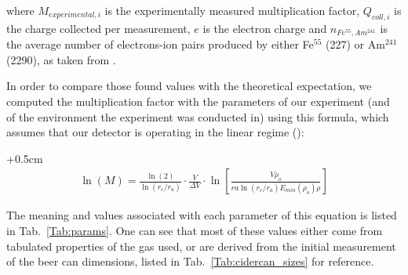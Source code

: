 where $M_{experimental,i}$ is the experimentally measured multiplication factor, $Q_{coll,i}$ is the charge collected per measurement, $e$ is the electron charge and $n_{Fe^{55},Am^{241}}$ is the average number of electrons-ion pairs produced by either Fe$^{55}$ (227) or Am$^{241}$ (2290), as taken from \cite{can_paper}.

In order to compare those found values with the theoretical expectation, we computed the multiplication factor with the parameters of our experiment (and of the environment the experiment was conducted in) using this formula, which assumes that our detector is operating in the linear regime (\cite{gas_detect}):

\begin{adjustwidth}{+0.5cm}{}
\begin{align}
\ln(M)=\frac{\ln(2)}{\ln(r_{c}/r_{a})}\cdot\frac{V}{\Delta V}\cdot\ln\left[ \frac{V\rho_{o}}{ra\ln(r_{c}/r_{a})E_{min}(\rho_{o})\rho}\right]
\label{eq:lnm}
\end{align}
\end{adjustwidth}

The meaning and values associated with each parameter of this equation is listed in Tab.~\ref{Tab:params}. One can see that most of these values either come from tabulated properties of the gas used, or are derived from the initial measurement of the beer can dimensions, listed in Tab.~\ref{Tab:cidercan_sizes} for reference.

